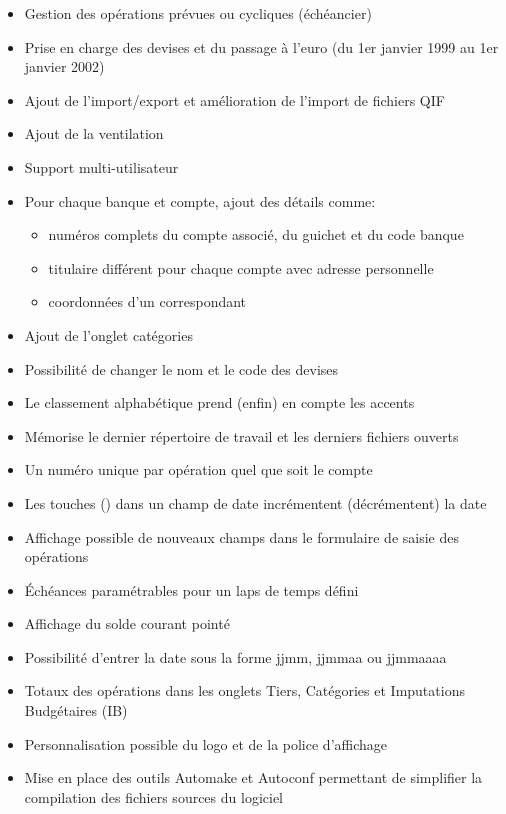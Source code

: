 \begin{itemize}
	\item Gestion des opérations prévues ou cycliques (échéancier) 
	\item Prise en charge des devises et du passage à l'euro (du 1er janvier 1999 au 1er janvier 2002)
	\item Ajout de l'import/export et amélioration de l'import de fichiers \gls{QIF}
	\item Ajout de la ventilation
	\item Support multi-utilisateur
	\item Pour chaque banque et compte, ajout des détails comme:
		\begin{itemize}
		\item numéros complets du compte associé, du guichet et du code banque
		\item titulaire différent pour chaque compte avec adresse personnelle
		\item coordonnées d'un correspondant
		\end{itemize}
	\item Ajout de l'onglet catégories
	\item Possibilité de changer le nom et le code des devises
	\item Le classement alphabétique prend (enfin) en compte les accents
	\item Mémorise le dernier répertoire de travail et les derniers fichiers ouverts
	\item Un numéro unique par opération quel que soit le compte
	\item Les touches \keys{{+}} (\keys{{-}}) dans un champ de date incrémentent (décrémentent) la date
	\item Affichage possible de nouveaux champs dans le formulaire de saisie des opérations 
	\item Échéances paramétrables pour un laps de temps défini
	\item Affichage du solde courant pointé
	\item Possibilité d'entrer la date sous la forme jjmm, jjmmaa ou jjmmaaaa
	\item Totaux des opérations dans les onglets Tiers, Catégories et Imputations Budgétaires (IB)
	\item Personnalisation possible du logo et de la police d'affichage
	\item Mise en place des outils Automake et Autoconf permettant de simplifier la compilation des fichiers sources du logiciel
\end{itemize}


